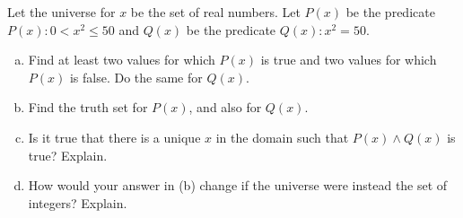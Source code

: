 \documentclass[11pt,letterpaper]{article}
\begin{document}
\newpage



 Let the universe for $x$ be the set of real numbers. Let $P(x)$ be the predicate $P(x) \colon 0 < x^2 \leq 50$ and $Q(x)$ be the predicate $Q(x) \colon x^2= 50$.
	\begin{enumerate}[(a)]
	\item Find at least two values for which $P(x)$ is true and two values for which $P(x)$ is false. Do the same for $Q(x)$. 
	\item Find the truth set for $P(x)$, and also for $Q(x)$.
	\item Is it true that there is a unique $x$ in the domain such that $P(x) \wedge Q(x)$ is true? Explain.
	\item How would your answer in (b) change if the universe were instead the set of integers? Explain. 
	\end{enumerate} \pspace
\end{document}
